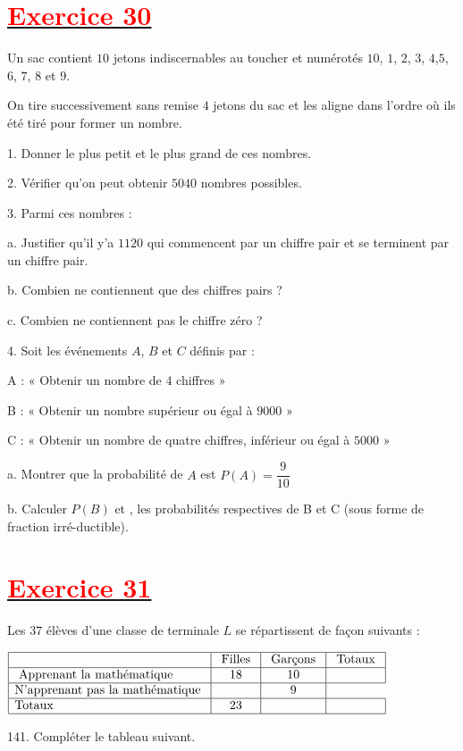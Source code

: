 \documentclass[12pt]{article}
\begin{document}
\section*{\underline{\textbf{\textcolor{red}{Exercice 30}}}}
Un sac contient $10$ jetons indiscernables au toucher et numérotés $10$, $1$, $2$, $3$, $4$,$5$, $6$, $7$, $8$ et $9.$

On tire successivement sans remise $4$ jetons du sac et les aligne dans l'ordre où ils été tiré pour former un nombre.

1. Donner le plus petit et le plus grand de ces nombres.

2. Vérifier qu'on peut obtenir $5040$ nombres possibles.

3. Parmi ces nombres :

a. Justifier qu'il y'a $1120$ qui commencent par un chiffre pair et se terminent par un chiffre pair.

b. Combien ne contiennent que des chiffres pairs ?

c. Combien ne contiennent pas le chiffre zéro ?

4. Soit les événements $A$, $B$ et $C$ définis par :

A : « Obtenir un nombre de $4$ chiffres »

B : « Obtenir un nombre supérieur ou égal à $9000$ »

C : « Obtenir un nombre de quatre chiffres, inférieur ou égal à $5000$ »

a. Montrer que la probabilité de $A$ est $P(A)=\dfrac{9}{10}$

b. Calculer $P(B)$ et , les probabilités respectives de B et C (sous forme de fraction irré-ductible).
\section*{\underline{\textbf{\textcolor{red}{Exercice 31}}}}
Les $37$ élèves d'une classe de terminale $L$ se répartissent de façon suivants :

$\begin{array}{|l|c|c|c|} \hline &\text{ Filles }&\text{ Garçons }&\text{ Totaux }\\ \hline \text{ Apprenant la mathématique }&18&10&\\ \hline \text{N’apprenant pas la mathématique }&&9\\ \hline \text{Totaux }&23&&\\ \hline \end{array}$

141. Compléter le tableau suivant.
\end{document}
